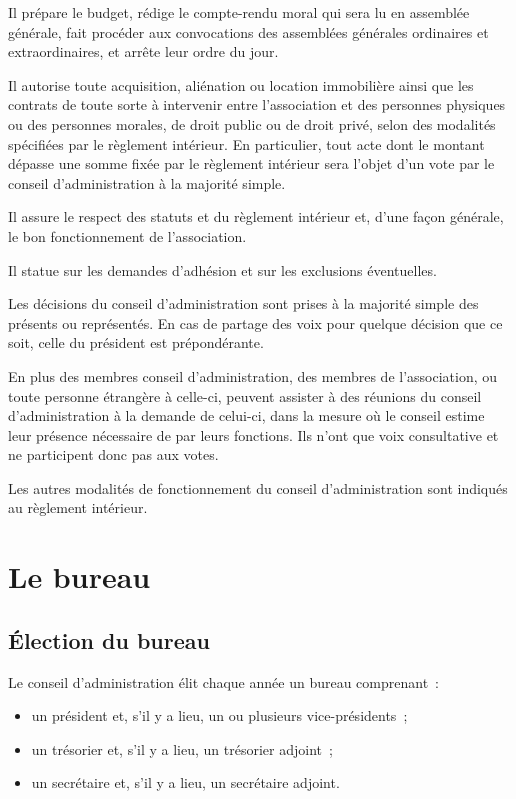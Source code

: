 \documentclass[a4wide,12pt]{scrartcl}
\begin{document}
Il prépare le budget, rédige le compte-rendu moral qui sera lu en
assemblée générale, fait procéder aux convocations des assemblées
générales ordinaires et extraordinaires, et arrête leur ordre du jour.

Il autorise toute acquisition, aliénation ou location immobilière
ainsi que les contrats de toute sorte à intervenir entre l'association
et des personnes physiques ou des personnes morales, de droit public
ou de droit privé, selon des modalités spécifiées par le règlement
intérieur. En particulier, tout acte dont le montant dépasse une somme
fixée par le règlement intérieur sera l'objet d'un vote par le conseil
d'administration à la majorité simple.

Il assure le respect des statuts et du règlement intérieur et, d'une
façon générale, le bon fonctionnement de l'association.

Il statue sur les demandes d'adhésion et sur les exclusions
éventuelles.

Les décisions du conseil d'administration sont prises à la majorité
simple des présents ou représentés. En cas de partage des voix pour
quelque décision que ce soit, celle du président est prépondérante.

En plus des membres conseil d'administration, des membres de
l'association, ou toute personne étrangère à celle-ci, peuvent
assister à des réunions du conseil d'administration à la demande de
celui-ci, dans la mesure où le conseil estime leur présence nécessaire
de par leurs fonctions. Ils n'ont que voix consultative et ne
participent donc pas aux votes.

Les autres modalités de fonctionnement du conseil d'administration
sont indiqués au règlement intérieur.

\section{Le bureau}

\subsection{Élection du bureau}

Le conseil d'administration élit chaque année un bureau comprenant~:
\begin{itemize}
\item un président et, s'il y a lieu, un ou plusieurs
  vice-présidents~;
\item un trésorier et, s'il y a lieu, un trésorier adjoint~; 
\item un secrétaire et, s'il y a lieu, un secrétaire adjoint.
\end{itemize}
\end{document}
